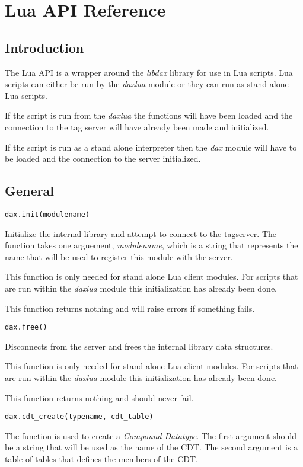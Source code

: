 \chapter{Lua API Reference}
\section{Introduction}
The Lua API is a wrapper around the \textit{libdax} library for use in Lua scripts.  Lua scripts can either be run by the \textit{daxlua} module or they can run as stand alone Lua scripts.

If the script is run from the \textit{daxlua} the functions will have been loaded and the connection to the tag server will have already been made and initialized.

If the script is run as a stand alone interpreter then the \textit{dax} module will have to be loaded and the connection to the server initialized.

\section{General}

\begin{verbatim}
dax.init(modulename)
\end{verbatim}
Initialize the internal library and attempt to connect to the tagserver.  The function takes one arguement, \textit{modulename}, which is a string that represents the name that will be used to register this module with the server.

This function is only needed for stand alone Lua client modules.  For scripts that are run within the \textit{daxlua} module this initialization has already been done.

This function returns nothing and will raise errors if something fails.
\begin{verbatim}
dax.free()
\end{verbatim}
Disconnects from the server and frees the internal library data structures.

This function is only needed for stand alone Lua client modules.  For scripts that are run within the \textit{daxlua} module this initialization has already been done.

This function returns nothing and should never fail.
\begin{verbatim}
dax.cdt_create(typename, cdt_table)
\end{verbatim}
The function is used to create a \textit{Compound Datatype}.  The first argument should be a string that will be used as the name of the CDT.  The second argument is a table of tables that defines the members of the CDT.

